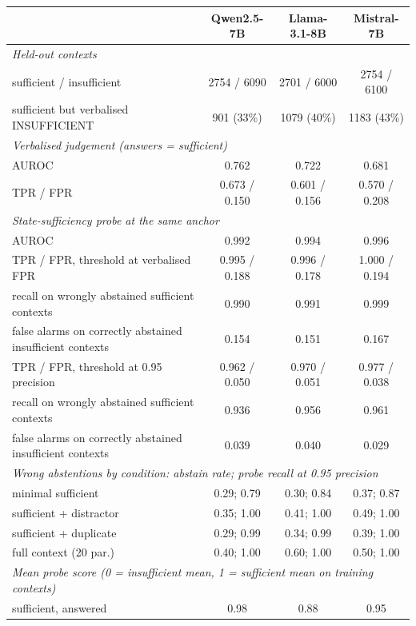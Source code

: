 \begin{tabular}{lccc}
\toprule
 & Qwen2.5-7B & Llama-3.1-8B & Mistral-7B \\
\midrule
\multicolumn{4}{l}{\emph{Held-out contexts}} \\
\quad sufficient / insufficient & 2754 / 6090 & 2701 / 6000 & 2754 / 6100 \\
\quad sufficient but verbalised INSUFFICIENT & 901 (33\%) & 1079 (40\%) & 1183 (43\%) \\
\multicolumn{4}{l}{\emph{Verbalised judgement (answers = sufficient)}} \\
\quad AUROC & 0.762 & 0.722 & 0.681 \\
\quad TPR / FPR & 0.673 / 0.150 & 0.601 / 0.156 & 0.570 / 0.208 \\
\multicolumn{4}{l}{\emph{State-sufficiency probe at the same anchor}} \\
\quad AUROC & 0.992 & 0.994 & 0.996 \\
\quad TPR / FPR, threshold at verbalised FPR & 0.995 / 0.188 & 0.996 / 0.178 & 1.000 / 0.194 \\
\qquad recall on wrongly abstained sufficient contexts & 0.990 & 0.991 & 0.999 \\
\qquad false alarms on correctly abstained insufficient contexts & 0.154 & 0.151 & 0.167 \\
\quad TPR / FPR, threshold at 0.95 precision & 0.962 / 0.050 & 0.970 / 0.051 & 0.977 / 0.038 \\
\qquad recall on wrongly abstained sufficient contexts & 0.936 & 0.956 & 0.961 \\
\qquad false alarms on correctly abstained insufficient contexts & 0.039 & 0.040 & 0.029 \\
\multicolumn{4}{l}{\emph{Wrong abstentions by condition: abstain rate; probe recall at 0.95 precision}} \\
\quad minimal sufficient & 0.29; 0.79 & 0.30; 0.84 & 0.37; 0.87 \\
\quad sufficient + distractor & 0.35; 1.00 & 0.41; 1.00 & 0.49; 1.00 \\
\quad sufficient + duplicate & 0.29; 0.99 & 0.34; 0.99 & 0.39; 1.00 \\
\quad full context (20 par.) & 0.40; 1.00 & 0.60; 1.00 & 0.50; 1.00 \\
\multicolumn{4}{l}{\emph{Mean probe score (0 = insufficient mean, 1 = sufficient mean on training contexts)}} \\
\quad sufficient, answered & 0.98 & 0.88 & 0.95 \\

\end{tabular}
